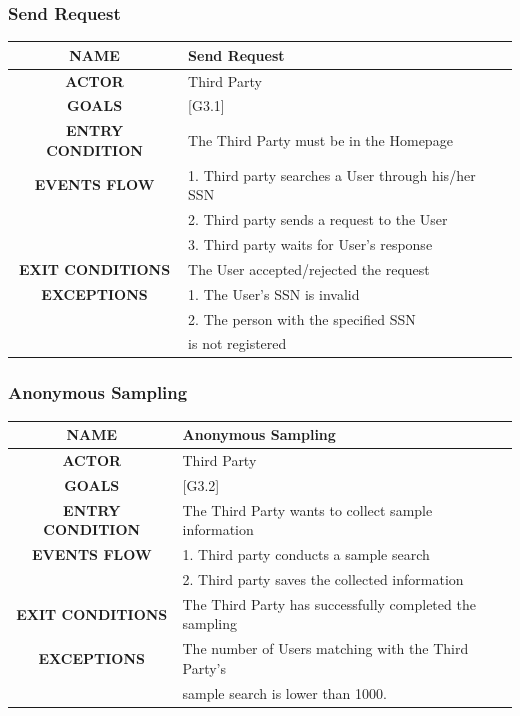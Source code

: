 \documentclass[12pt,a4paper]{article}
\begin{document}
		\subsubsection{Send Request}
		\begin{center}
			\begin{tabular}{| c | l |}
				\hline
				\textbf{NAME} & Send Request \\
				\hline
				\textbf{ACTOR} & Third Party \\
				\hline
				\textbf{GOALS} & [G3.1] \\
				\hline
				\textbf{ENTRY CONDITION} & The Third Party must be in the Homepage \\ \hline
				\textbf{EVENTS FLOW}  &
				1. Third party searches a User through his/her SSN\\
				&2. Third party sends a request to the User\\
				&3. Third party waits for User's response\\
				\hline
				\textbf{EXIT CONDITIONS}  & The User accepted/rejected the request \\ \hline
				\textbf{EXCEPTIONS} &
				1. The User's SSN is invalid\\
				&2. The person with the specified SSN\\
				&is not registered\\
				\hline
			\end{tabular}
		\end{center}

		\subsubsection{Anonymous Sampling}
		\begin{center}
			\begin{tabular}{| c | l |}
				\hline
				\textbf{NAME} & Anonymous Sampling \\
				\hline
				\textbf{ACTOR} & Third Party \\
				\hline
				\textbf{GOALS} & [G3.2] \\
				\hline
				\textbf{ENTRY CONDITION} & The Third Party wants to collect sample information \\ \hline
				\textbf{EVENTS FLOW}  &
				1. Third party conducts a sample search\\
				&2. Third party saves the collected information\\
				\hline
				\textbf{EXIT CONDITIONS}  & The Third Party has successfully completed the sampling \\ \hline
				\textbf{EXCEPTIONS} &
				The number of Users matching with the Third Party's\\
				&sample search is lower than 1000.\\
				\hline
			\end{tabular}
		\end{center}
\end{document}
